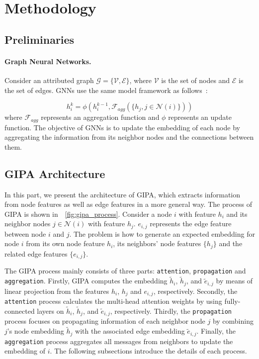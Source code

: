 \documentclass[sigconf]{acmart}
\newcommand{\model}{GIPA\xspace}
\begin{document}
\section{Methodology}
\label{sec:method}
\subsection{Preliminaries}

\paragraph{Graph Neural Networks.} Consider an attributed graph $\mathcal{G}=\{\mathcal{V}, \mathcal{E}\}$, where $\mathcal{V}$ is the set of nodes and $\mathcal{E}$ is the set of edges. GNNs use the same model framework as follows~\cite{hamilton2017inductive,xu2018powerful}:

\begin{equation}
\label{eq:gnn}
h_i^k=\phi(h_i^{k-1}, \mathcal{F}_{agg}(\{h_j, j\in\mathcal{N}(i)\}))
\end{equation}
\noindent where $\mathcal{F}_{agg}$ represents an aggregation function and $\phi$ represents an update function. The objective of GNNs is to update the embedding of each node by aggregating the information from its neighbor nodes and the connections between them. 

\subsection{GIPA Architecture}

In this part, we present the architecture of \model, which  extracts information from node features as well as edge features in a more general way. The process of \model is shown in~\figurename~\ref{fig:gipa_process}. Consider a node $i$ with feature $h_i$ and its neighbor nodes $j\in\mathcal{N}(i)$ with feature $h_j$. $e_{i, j}$ represents the edge feature between node $i$ and $j$. The problem is how to generate an expected embedding for node $i$ from its own node feature $h_i$, its neighbors' node features $\{h_j\}$ and the related edge features $\{e_{i, j}\}$. 

The \model process mainly consists of three parts: \texttt{attention}, \texttt{propagation} and \texttt{aggregation}. Firstly, \model computes the embedding $\tilde{h}_i$, $\tilde{h}_j$, and $\tilde{e}_{i, j}$ by means of linear projection from the features $h_i$, $h_j$ and $e_{i,j}$, respectively. Secondly, the \texttt{attention} process calculates the multi-head attention weights by using fully-connected layers on $\tilde{h}_i$, $\tilde{h}_j$, and $\tilde{e}_{i, j}$, respectively. Thirdly, the \texttt{propagation} process focuses on propagating information of each neighbor node $j$ by combining $j$'s node embedding $\tilde{h}_j$ with the associated edge embedding $\tilde{e}_{i, j}$. Finally, the \texttt{aggregation} process aggregates all messages from neighbors to update the embedding of $i$. The following subsections introduce the details of each process.
\end{document}
